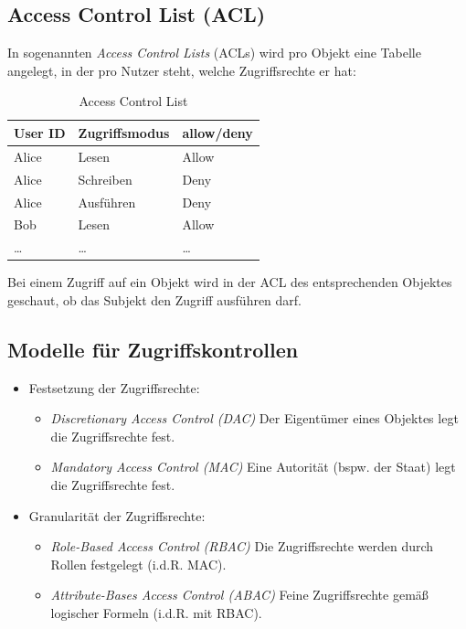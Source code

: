 \documentclass[a4paper, 11pt, accentcolor = tud3b]{tudreport}
\begin{document}
            \subsection{Access Control List (ACL)}
                In sogenannten \textit{Access Control Lists} (ACLs) wird pro Objekt eine Tabelle angelegt, in der pro Nutzer steht, welche Zugriffsrechte er hat:
                \begin{table}[H]
                	\centering
                	\begin{tabular}{| l | l | l |}
                		\hline
                		\textbf{User ID} & \textbf{Zugriffsmodus} & \textbf{allow/deny} \\ \hline
                		Alice            & Lesen                  & Allow               \\
                		Alice            & Schreiben              & Deny                \\
                		Alice            & Ausführen              & Deny                \\
                		Bob              & Lesen                  & Allow               \\
                		\dots            & \dots                  & \dots               \\ \hline
                	\end{tabular}
                	\caption{Access Control List}
                \end{table}
	            Bei einem Zugriff auf ein Objekt wird in der ACL des entsprechenden Objektes geschaut, ob das Subjekt den Zugriff ausführen darf.

            \subsection{Modelle für Zugriffskontrollen}
                \begin{itemize}
                	\item Festsetzung der Zugriffsrechte:
	                	\begin{itemize}
		                	\item \textit{Discretionary Access Control (DAC)}    \tabto{4cm} Der Eigentümer eines Objektes legt die Zugriffsrechte fest.
		                	\item \textit{Mandatory Access Control (MAC)}        \tabto{4cm} Eine Autorität (bspw. der Staat) legt die Zugriffsrechte fest.
		                \end{itemize}
	                \item Granularität der Zugriffsrechte:
		                \begin{itemize}
		                	\item \textit{Role-Based Access Control (RBAC)}      \tabto{4cm} Die Zugriffsrechte werden durch Rollen festgelegt (i.d.R. MAC).
		                	\item \textit{Attribute-Bases Access Control (ABAC)} \tabto{4cm} Feine Zugriffsrechte gemäß logischer Formeln (i.d.R. mit RBAC).
		                \end{itemize}
                \end{itemize}
\end{document}
